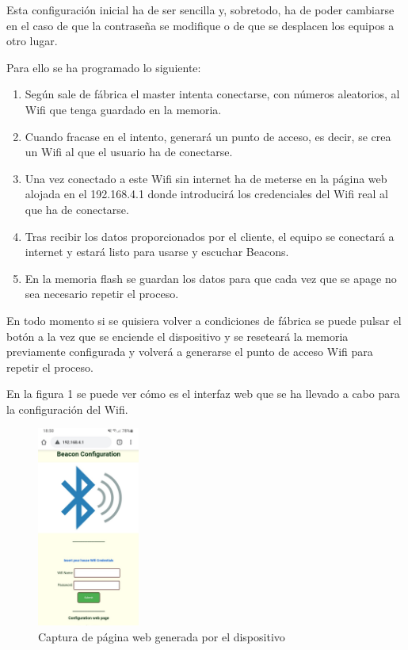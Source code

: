 \documentclass[paper=a4, fontsize=11pt,twoside]{scrartcl}
\begin{document}
            Esta configuración inicial ha de ser sencilla y, sobretodo, ha de poder cambiarse en el caso de que la contraseña se modifique o de que se desplacen 
            los equipos a otro lugar.
            
            Para ello se ha programado lo siguiente:
            \begin{enumerate}
                \item Según sale de fábrica el master intenta conectarse, con números aleatorios, al Wifi que tenga guardado en la memoria.
                \item Cuando fracase en el intento, generará un punto de acceso, es decir, se crea un Wifi al que el usuario ha de conectarse.
                \item Una vez conectado a este Wifi sin internet ha de meterse en la página web alojada en el 192.168.4.1 donde introducirá los credenciales 
                del Wifi real al que ha de conectarse.
                \item Tras recibir los datos proporcionados por el cliente, el equipo se conectará a internet y estará listo para usarse y escuchar Beacons.
                \item En la memoria flash se guardan los datos para que cada vez que se apage no sea necesario repetir el proceso.
            \end{enumerate}
            En todo momento si se quisiera volver a condiciones de fábrica se puede pulsar el botón a la vez que se enciende el dispositivo y se reseteará 
            la memoria previamente configurada y volverá a generarse el punto de acceso Wifi para repetir el proceso.
            
            En la figura 1 se puede ver cómo es el interfaz web que se ha llevado a cabo para la configuración del Wifi.
            \begin{center}
                \begin{figure}[!h]
                    \centering
                    \includegraphics[width=0.3\textwidth]{../../Memmory/images/AP_wifi_config.jpeg}
                    \caption{Captura de página web generada por el dispositivo}
                    \label{fig:mesh12}
                \end{figure}
            \end{center}
\end{document}
